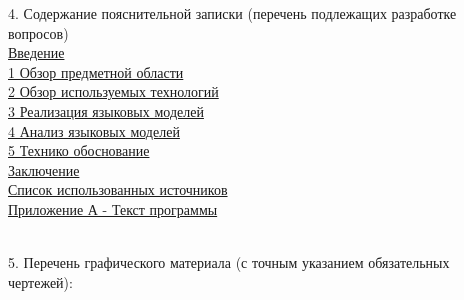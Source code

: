 {  \hspace*{0.2em}4. Содержание пояснительной записки (перечень подлежащих разработке вопросов) \\
  \uline{\mbox{\hspace*{0.5em}} Введение\hspace*{\fill}}\\
  \uline{\mbox{\hspace*{0.5em}} 1 Обзор предметной области\hspace*{\fill}}\\
  \uline{\mbox{\hspace*{0.5em}} 2 Обзор используемых технологий\hspace*{\fill}}\\
  \uline{\mbox{\hspace*{0.5em}} 3 Реализация языковых моделей\hspace*{\fill}}\\
  \uline{\mbox{\hspace*{0.5em}} 4 Анализ языковых моделей\hspace*{\fill}}\\
  \uline{\mbox{\hspace*{0.5em}} 5 \mbox{Технико} обоснование\hspace*{\fill}}\\
  \uline{\mbox{\hspace*{0.5em}} Заключение\hspace*{\fill}}\\
  \uline{\mbox{\hspace*{0.5em}} Список использованных источников\hspace*{\fill}}\\
  \uline{\mbox{\hspace*{0.5em}} Приложение А - Текст программы\hspace*{\fill}}\\
  \lineunderscore\\
  \lineunderscore

  \vspace{1em}
  
  \thispagestyle{empty}
  
  \hspace*{0.2em}5. Перечень графического материала (с точным указанием обязательных чертежей):
  \lineunderscore\\
  \lineunderscore\\
  \lineunderscore\\
  \lineunderscore\\
  \lineunderscore\\
  \lineunderscore\\
  \lineunderscore\\
  \lineunderscore

}
